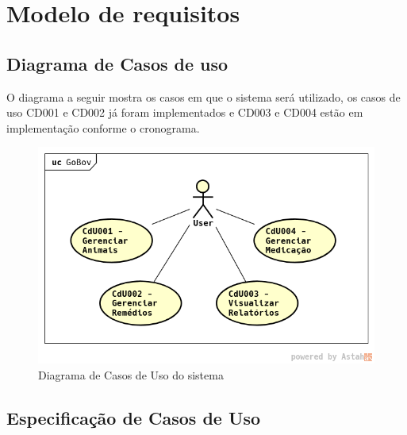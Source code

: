 \documentclass[12pt]{article}
\begin{document}
\newpage

\section{Modelo de requisitos}

\subsection{Diagrama de Casos de uso}

O diagrama a seguir mostra os casos em que o sistema será utilizado, os casos de uso CD001 e CD002 já foram implementados e CD003 e CD004 estão em implementação conforme o cronograma.

\begin{figure}[!h]
	\begin{center}
		\caption{Diagrama de Casos de Uso do sistema}
		\includegraphics[width=6in]{img/casosdeuso.png}

	\end{center}
\end{figure}

\newpage

\subsection{Especificação de Casos de Uso}
\end{document}
